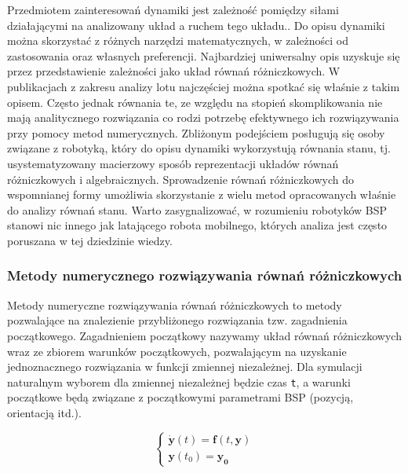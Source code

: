 Przedmiotem zainteresowań dynamiki jest zależność pomiędzy siłami działającymi na analizowany układ a ruchem tego układu.\cite{mw}.  Do opisu dynamiki można skorzystać z różnych narzędzi matematycznych, w zależności od zastosowania oraz własnych preferencji. Najbardziej uniwersalny opis uzyskuje się przez przedstawienie zależności jako układ równań różniczkowych. W publikacjach z zakresu analizy lotu najczęściej można spotkać się właśnie z takim opisem.\cite{energies}\cite{quaterion} Często jednak równania te, ze względu na stopień skomplikowania nie mają analitycznego rozwiązania co rodzi potrzebę efektywnego ich rozwiązywania przy pomocy metod numerycznych. Zbliżonym podejściem posługują się osoby związane z robotyką, który do opisu dynamiki wykorzystują równania stanu, tj. usystematyzowany macierzowy sposób reprezentacji układów równań różniczkowych i algebraicznych. Sprowadzenie równań różniczkowych do wspomnianej formy umożliwia skorzystanie z wielu metod opracowanych właśnie do analizy równań stanu. Warto zasygnalizować, w rozumieniu robotyków BSP stanowi nic innego jak latającego robota mobilnego, których analiza jest często poruszana w tej dziedzinie wiedzy.

\subsubsection{Metody numerycznego rozwiązywania równań różniczkowych}

Metody numeryczne rozwiązywania równań różniczkowych to metody pozwalające na znalezienie przybliżonego rozwiązania tzw. zagadnienia początkowego. Zagadnieniem początkowy nazywamy układ równań różniczkowych wraz ze zbiorem warunków początkowych, pozwalającym na uzyskanie jednoznacznego rozwiązania w funkcji zmiennej niezależnej. Dla symulacji naturalnym wyborem dla zmiennej niezależnej będzie czas \texttt{t}, a warunki początkowe będą związane z początkowymi parametrami BSP (pozycją, orientacją itd.).

\[
	\begin{cases}
		\dot{\bm{y}} \left( t \right)  = \bm{f} \left( t,\bm{y}\right) \\
		\bm{y} \left( t_0 \right) = \bm{y_0}
	\end{cases}
\]

